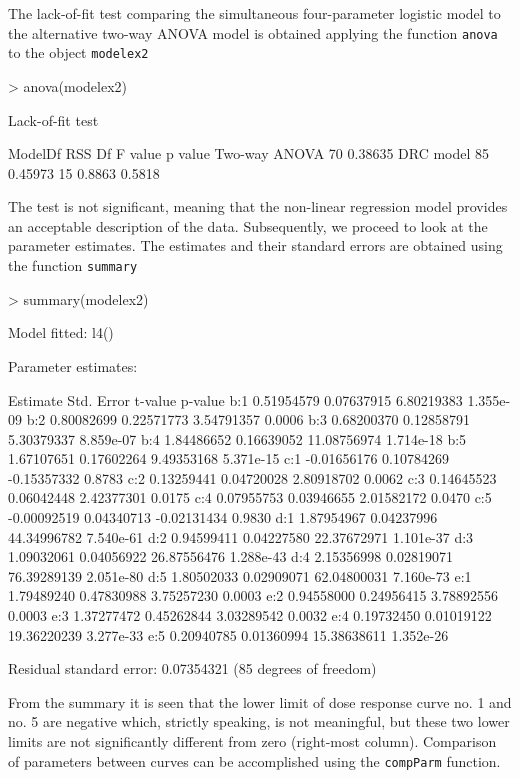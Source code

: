 \documentclass[a4paper]{article}
\begin{document}
The lack-of-fit test comparing the simultaneous four-parameter logistic model to the alternative two-way ANOVA model is obtained applying the
function \verb+anova+ to the object \verb+modelex2+

\begin{Schunk}
\begin{Sinput}
> anova(modelex2)
\end{Sinput}
\begin{Soutput}
Lack-of-fit test

              ModelDf     RSS Df F value p value
Two-way ANOVA      70 0.38635                   
DRC model          85 0.45973 15  0.8863  0.5818
\end{Soutput}
\end{Schunk}
The test is not significant, meaning that the non-linear regression model provides an acceptable description of the data.
Subsequently, we proceed to look at the parameter estimates. The estimates and their standard errors are obtained using the function \verb+summary+

\begin{Schunk}
\begin{Sinput}
> summary(modelex2)
\end{Sinput}
\begin{Soutput}
Model fitted: l4()

Parameter estimates:

       Estimate  Std. Error     t-value   p-value
b:1  0.51954579  0.07637915  6.80219383 1.355e-09
b:2  0.80082699  0.22571773  3.54791357    0.0006
b:3  0.68200370  0.12858791  5.30379337 8.859e-07
b:4  1.84486652  0.16639052 11.08756974 1.714e-18
b:5  1.67107651  0.17602264  9.49353168 5.371e-15
c:1 -0.01656176  0.10784269 -0.15357332    0.8783
c:2  0.13259441  0.04720028  2.80918702    0.0062
c:3  0.14645523  0.06042448  2.42377301    0.0175
c:4  0.07955753  0.03946655  2.01582172    0.0470
c:5 -0.00092519  0.04340713 -0.02131434    0.9830
d:1  1.87954967  0.04237996 44.34996782 7.540e-61
d:2  0.94599411  0.04227580 22.37672971 1.101e-37
d:3  1.09032061  0.04056922 26.87556476 1.288e-43
d:4  2.15356998  0.02819071 76.39289139 2.051e-80
d:5  1.80502033  0.02909071 62.04800031 7.160e-73
e:1  1.79489240  0.47830988  3.75257230    0.0003
e:2  0.94558000  0.24956415  3.78892556    0.0003
e:3  1.37277472  0.45262844  3.03289542    0.0032
e:4  0.19732450  0.01019122 19.36220239 3.277e-33
e:5  0.20940785  0.01360994 15.38638611 1.352e-26

Residual standard error: 0.07354321 (85 degrees of freedom)
\end{Soutput}
\end{Schunk}
From the summary it is seen that the lower limit of dose response curve no. 1 and no. 5 are negative which, strictly speaking, is not meaningful,
but these two lower limits are not significantly different from zero (right-most column). Comparison of parameters between curves can
be accomplished using the \verb+compParm+ function.
\end{document}
